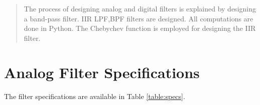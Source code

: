 \documentclass[journal,12pt,twocolumn]{IEEEtran}
\begin{document}
\tableofcontents

\bigskip

\begin{abstract}
The process of designing analog and digital filters is explained by designing a band-pass filter. IIR LPF,BPF filters are designed. All computations are
done in Python. The Chebychev function is employed for designing the IIR filter.
\end{abstract}




%
\IEEEpeerreviewmaketitle


%
%


\section{Analog Filter Specifications}
The filter specifications are available in Table \ref{table:specs}.

\renewcommand{\thetable}{\theproblem}
%
%
% 
% 
%
%
\end{document}

